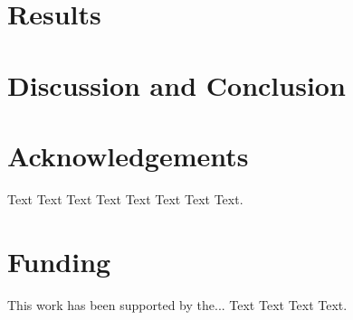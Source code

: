 \documentclass{bioinfo}
\begin{document}







\section{Results}





%
%






\section{Discussion and Conclusion}


\section*{Acknowledgements}

Text Text Text Text Text Text  Text Text. \vspace*{-12pt}

\section*{Funding}

This work has been supported by the... Text Text  Text Text.\vspace*{-12pt}
\end{document}
